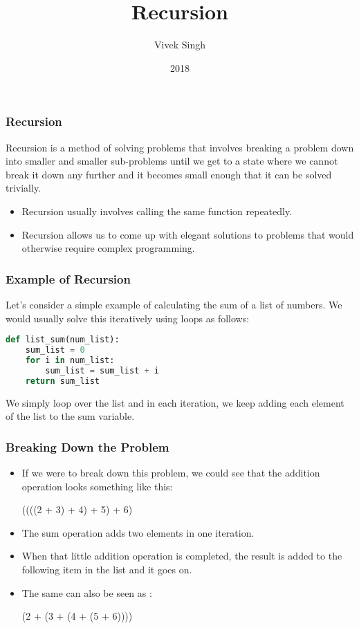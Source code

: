 \documentclass{beamer}
\title{Recursion}
\author{Vivek Singh}
\institute{Information Systems Decision Sciences (ISDS)\\
MUMA College of Business\\
University of South Florida \\
Tampa, Florida}
\date{2018}
\begin{document}
\frame{\titlepage}

\begin{frame}
\frametitle{Recursion}
Recursion is a method of solving problems that involves breaking a problem down into smaller
and smaller sub-problems until we get to a state where we cannot break it down any further and it becomes small enough that it can be solved trivially.
\begin{itemize}
\item Recursion usually involves calling the same function repeatedly.
\item Recursion allows us to come up with elegant solutions to problems that would otherwise require complex programming.
\end{itemize}
\end{frame}

\begin{frame}[fragile]
\frametitle{Example of Recursion}
Let's consider a simple example of calculating the sum of a list of numbers. We would usually solve this iteratively using loops as follows:
\begin{lstlisting}[language=Python]
def list_sum(num_list):
    sum_list = 0
    for i in num_list:
        sum_list = sum_list + i
    return sum_list
\end{lstlisting}
We simply loop over the list and in each iteration, we keep adding each element of the list to the sum variable.
\end{frame}

\begin{frame}[fragile]
\frametitle{Breaking Down the Problem}

\begin{itemize}
\item If we were to break down this problem, we could see that the addition operation looks something like this:

((((2 + 3) + 4) + 5) + 6)
\item The sum operation adds two elements in one iteration.
\item When that little addition operation is completed, the result is added to the following item in the list and it goes on.
\item The same can also be seen as :

(2 + (3 + (4 + (5 + 6))))
\end{itemize}
\end{frame}
\end{document}
